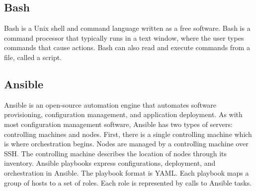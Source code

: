 \subsection{Bash} \label{lang:bash}
Bash is a Unix shell and command language written as a free software.
Bash is a command processor that typically runs in a text window, where the user types commands that cause actions.
Bash can also read and execute commands from a file, called a script. \cite{bash}
\subsection{Ansible} \label{lang:ansible}
Ansible is an open-source automation engine that automates software provisioning, configuration management, and application deployment.
As with most configuration management software, Ansible has two types of servers: controlling machines and nodes.
First, there is a single controlling machine which is where orchestration begins.
Nodes are managed by a controlling machine over SSH.
The controlling machine describes the location of nodes through its inventory.
Ansible playbooks express configurations, deployment, and orchestration in Ansible.
The playbook format is YAML. 
Each playbook maps a group of hosts to a set of roles.
Each role is represented by calls to Ansible tasks.
 \cite{ansible} 
